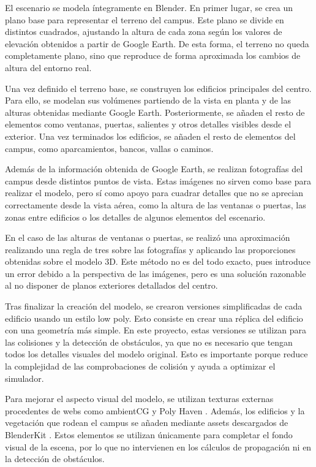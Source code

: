 El escenario se modela íntegramente en Blender. En primer lugar, se crea un plano base para representar el terreno del campus. Este plano se divide en distintos cuadrados, ajustando la altura de cada zona según los valores de elevación obtenidos a partir de Google Earth. De esta forma, el terreno no queda completamente plano, sino que reproduce de forma aproximada los cambios de altura del entorno real.

Una vez definido el terreno base, se construyen los edificios principales del centro. Para ello, se modelan sus volúmenes partiendo de la vista en planta y de las alturas obtenidas mediante Google Earth. Posteriormente, se añaden el resto de elementos como ventanas, puertas, salientes y otros detalles visibles desde el exterior. Una vez terminados los edificios, se añaden el resto de elementos del campus, como aparcamientos, bancos, vallas o caminos.

Además de la información obtenida de Google Earth, se realizan fotografías del campus desde distintos puntos de vista. Estas imágenes no sirven como base para realizar el modelo, pero sí como apoyo para cuadrar detalles que no se aprecian correctamente desde la vista aérea, como la altura de las ventanas o puertas, las zonas entre edificios o los detalles de algunos elementos del escenario. 

En el caso de las alturas de ventanas o puertas, se realizó una aproximación realizando una regla de tres sobre las fotografías y aplicando las proporciones obtenidas sobre el modelo 3D. Este método no es del todo exacto, pues introduce un error debido a la perspectiva de las imágenes, pero es una solución razonable al no disponer de planos exteriores detallados del centro.

Tras finalizar la creación del modelo, se crearon versiones simplificadas de cada edificio usando un estilo low poly. Esto consiste en crear una réplica del edificio con una geometría más simple. En este proyecto, estas versiones se utilizan para las colisiones y la detección de obstáculos, ya que no es necesario que tengan todos los detalles visuales del modelo original. Esto es importante porque reduce la complejidad de las comprobaciones de colisión y ayuda a optimizar el simulador.

Para mejorar el aspecto visual del modelo, se utilizan texturas externas procedentes de webs como ambientCG \cite{ambientcg} y Poly Haven \cite{polyhaven}. Además, los edificios y la vegetación que rodean el campus se añaden mediante assets descargados de BlenderKit \cite{blendkit}. Estos elementos se utilizan únicamente para completar el fondo visual de la escena, por lo que no intervienen en los cálculos de propagación ni en la detección de obstáculos.

